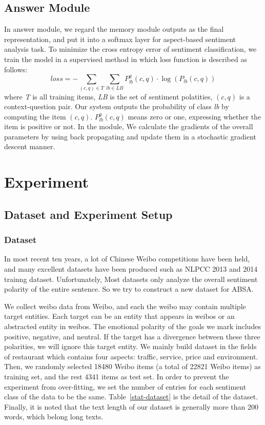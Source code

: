 \documentclass{ieeeaccess}
\begin{document}
\subsection{Answer Module}
In answer module, we regard the memory module outputs as the final representation, and put it into a softmax layer for aspect-based sentiment analysis task. To minimize the cross entropy error of sentiment classification, we train the model in a supervised method in which loss function is described as follows:
\begin{equation}loss = -\sum_{\left(c, q\right)\in T}\sum_{lb\in LB}P_{lb}^g\left(c, q\right)\cdot \log\left(P_{lb}\left(c, q\right)\right)\end{equation}
where \emph{T} is all training items, \emph{LB} is the set of sentiment polatities, $\left(c, q\right)$ is a context-question pair. Our system outputs the probability of class \emph{lb} by computing the item $\left(c, q\right)$. $P_{lb}^g\left(c, q\right)$ means zero or one, expressing whether the item is positive or not. In the module, We calculate the gradients of the overall parameters by using back propagating and update them in a stochastic gradient descent manner.

\section{Experiment}

\subsection{Dataset and Experiment Setup}

\subsubsection{Dataset}
In most recent ten years, a lot of Chinese Weibo competitions have been held, and many excellent datasets have been produced such as NLPCC 2013 and 2014 trainng dataset. Unfortunately, Most datasets only analyze the overall sentiment polarity of the entire sentence. So we try to construct a new dataset for ABSA. 

We collect weibo data from Weibo, and each the weibo may contain multiple target entities. Each target can be an entity that appears in weibos or an abstracted entity in weibos. The emotional polarity of the goals we mark includes positive, negative, and neutral. If the target has a divergence between these three polarities, we will ignore this target entity. We mainly build dataset in the fields of restaurant which contains four aspects: traffic, service, price and environment. Then, we randomly selected 18480 Weibo items (a total of 22821 Weibo items) as training set, and the rest 4341 items as test set. In order to prevent the experiment from over-fitting, we set the number of entries for each sentiment class of the data to be the same. Table~\ref{stat-dataset} is the detail of the dataset. Finally, it is noted that the text length of our dataset is generally more than 200 words, which belong long texts. 
\end{document}

